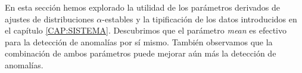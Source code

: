 En esta sección hemos explorado la utilidad de los parámetros derivados de ajustes de distribuciones $\alpha$-estables y la tipificación de los datos introducidos en el capítulo \ref{CAP:SISTEMA}. Descubrimos que el parámetro \textit{mean} es efectivo para la detección de anomalías por sí mismo. También observamos que la combinación de ambos parámetros puede mejorar aún más la detección de anomalías.